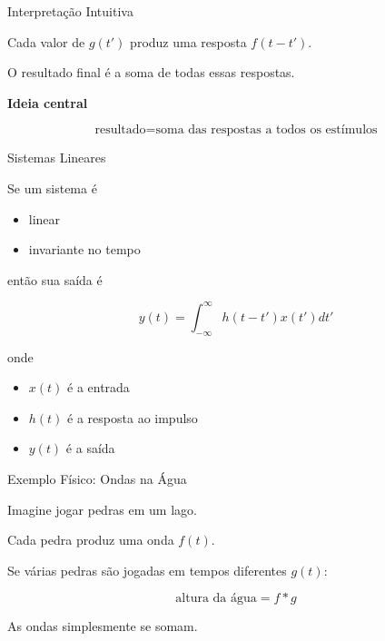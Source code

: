 \documentclass[aspectratio=169]{beamer}
\begin{document}

\begin{frame}{Interpretação Intuitiva}

Cada valor de $g(t')$ produz uma resposta $f(t-t')$.

O resultado final é a soma de todas essas respostas.

\begin{center}
\textbf{Ideia central}

\[
\text{resultado} =
\text{soma das respostas a todos os estímulos}
\]
\end{center}

\end{frame}


\begin{frame}{Sistemas Lineares}

Se um sistema é

\begin{itemize}
\item linear
\item invariante no tempo
\end{itemize}

então sua saída é

\[
y(t)=\int_{-\infty}^{\infty} h(t-t')x(t')dt'
\]

onde

\begin{itemize}
\item $x(t)$ é a entrada
\item $h(t)$ é a resposta ao impulso
\item $y(t)$ é a saída
\end{itemize}

\end{frame}


\begin{frame}{Exemplo Físico: Ondas na Água}

Imagine jogar pedras em um lago.

Cada pedra produz uma onda $f(t)$.

Se várias pedras são jogadas em tempos diferentes $g(t)$:

\[
\text{altura da água} = f * g
\]

As ondas simplesmente se somam.

\end{frame}
\end{document}
